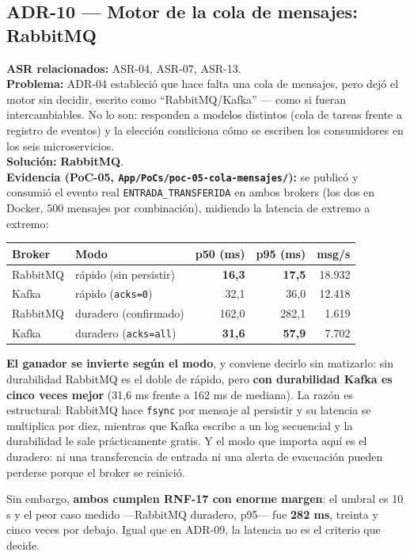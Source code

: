 \documentclass[11pt,a4paper]{article}
\begin{document}
\subsection*{ADR-10 --- Motor de la cola de mensajes: RabbitMQ}
\textbf{ASR relacionados:} ASR-04, ASR-07, ASR-13.\\
\textbf{Problema:} ADR-04 estableció que hace falta una cola de mensajes, pero dejó el motor sin
decidir, escrito como ``RabbitMQ/Kafka'' --- como si fueran intercambiables. No lo son: responden a
modelos distintos (cola de tareas frente a registro de eventos) y la elección condiciona cómo se
escriben los consumidores en los seis microservicios.\\
\textbf{Solución:} \textbf{RabbitMQ}.\\
\textbf{Evidencia (PoC-05, \texttt{App/PoCs/poc-05-cola-mensajes/}):} se publicó y consumió el evento
real \texttt{ENTRADA\_TRANSFERIDA} en ambos brokers (los dos en Docker, 500 mensajes por
combinación), midiendo la latencia de extremo a extremo:

\begin{center}
\begin{tabular}{llrrr}
\toprule
\textbf{Broker} & \textbf{Modo} & \textbf{p50 (ms)} & \textbf{p95 (ms)} & \textbf{msg/s}\\
\midrule
RabbitMQ & rápido (sin persistir) & \textbf{16,3} & \textbf{17,5} & 18.932\\
Kafka & rápido (\texttt{acks=0}) & 32,1 & 36,0 & 12.418\\
RabbitMQ & duradero (confirmado) & 162,0 & 282,1 & 1.619\\
Kafka & duradero (\texttt{acks=all}) & \textbf{31,6} & \textbf{57,9} & 7.702\\
\bottomrule
\end{tabular}
\end{center}

\textbf{El ganador se invierte según el modo}, y conviene decirlo sin matizarlo: sin durabilidad
RabbitMQ es el doble de rápido, pero \textbf{con durabilidad Kafka es cinco veces mejor} (31,6 ms
frente a 162 ms de mediana). La razón es estructural: RabbitMQ hace \texttt{fsync} por mensaje al
persistir y su latencia se multiplica por diez, mientras que Kafka escribe a un log secuencial y la
durabilidad le sale prácticamente gratis. Y el modo que importa aquí es el duradero: ni una
transferencia de entrada ni una alerta de evacuación pueden perderse porque el broker se reinició.

Sin embargo, \textbf{ambos cumplen RNF-17 con enorme margen}: el umbral es 10 s y el peor caso medido
—RabbitMQ duradero, p95— fue \textbf{282 ms}, treinta y cinco veces por debajo. Igual que en ADR-09,
la latencia no es el criterio que decide.
\end{document}
